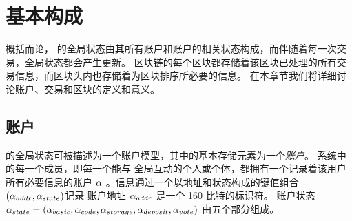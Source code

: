 

\section{基本构成}
概括而论，{\name} 的全局状态由其所有账户和账户的相关状态构成，而伴随着每一次交易，全局状态都会产生更新。 
{\name} 区块链的每个区块都存储着该区块已处理的所有交易信息，而区块头内也存储着为区块排序所必要的信息。
在本章节我们将详细讨论账户、交易和区块的定义和意义。


\subsection{账户}
\label{subsec:accounts}

{\name} 的全局状态可被描述为一个账户模型，其中的基本存储元素为一个\emph{账户}。
系统中的每一个成员，即每一个能与 {\name} 全局互动的个人或个体，都拥有一个记录着该用户所有必要信息的账户 $\mathbf{\alpha}$ 。信息通过一个以地址和状态构成的键值组合 $(\mathbf{\alpha}_{addr}, \mathbf{\alpha}_{state})$记录
%
账户地址 $\mathbf{\alpha}_{addr}$ 是一个 160 比特的标识符。
账户状态 $\mathbf{\alpha}_{state}= (\mathbf{\alpha}_{basic},\mathbf{\alpha}_{code}, \mathbf{\alpha}_{storage},\mathbf{\alpha}_{deposit},\mathbf{\alpha}_{vote})$ 由五个部分组成。

